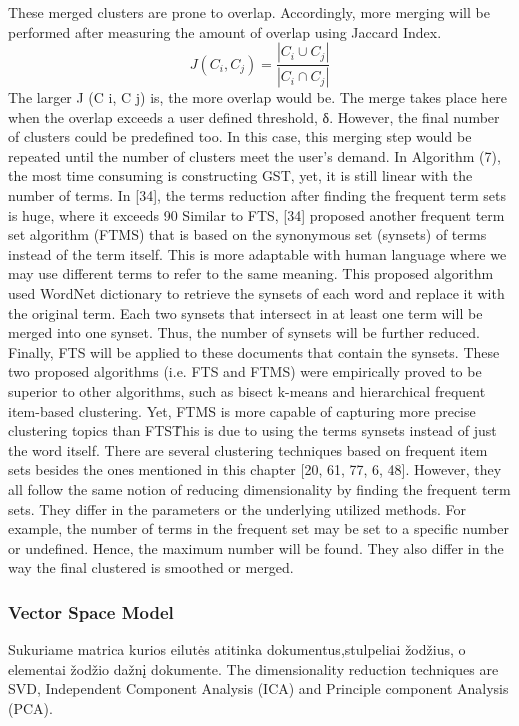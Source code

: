 \documentclass{VUMIFInfKursinis}
\begin{document}
These merged clusters are prone to overlap. Accordingly, more merging will be performed after measuring the amount of overlap using Jaccard Index.
\begin{equation}
	J(C_i,C_j) = \frac{|C_i \cup C_j|}{|C_i \cap C_j|}
\end{equation}
The larger J (C i, C j) is, the more overlap would be. The merge takes place here when the overlap exceeds a user defined threshold, δ. However, the final number of clusters could be predefined too. In this case, this merging step would be repeated until the number of clusters meet the user’s demand.
In Algorithm (7), the most time consuming is constructing GST, yet, it is still linear with the number of terms. In [34], the terms reduction after finding the frequent term sets is huge, where it exceeds 90%
Similar to FTS, [34] proposed another frequent term set algorithm (FTMS) that is based on the synonymous set (synsets) of terms instead of the term itself. This is more adaptable with human language where we may use different terms to refer to the same meaning.  This proposed algorithm used WordNet dictionary to retrieve the synsets of each word and replace it with the original term. Each two synsets that intersect in at least one term will be merged into one synset. Thus, the number of synsets will be further reduced. Finally, FTS will be applied to these documents that contain the synsets.
These two proposed algorithms (i.e. FTS and FTMS) were empirically proved to be superior to other algorithms, such as bisect k-means and hierarchical frequent item-based clustering. Yet, FTMS is more capable of capturing more precise clustering topics than FTS\. This is due to using the terms synsets instead of just the word itself.
There are several clustering techniques based on frequent item sets besides the ones mentioned in this chapter [20, 61, 77, 6, 48]. However, they all follow the same notion of reducing dimensionality by finding the frequent term sets. They differ in the parameters or the underlying utilized methods. For example, the number of terms in the frequent set may be set to a specific number or undefined. Hence, the maximum number will be found. They also differ in the way the final clustered is smoothed or merged.

\subsubsection{Vector Space Model}
Sukuriame matrica kurios eilutės atitinka dokumentus,stulpeliai žodžius, o elementai žodžio dažnį dokumente.
The dimensionality reduction techniques are SVD, Independent Component Analysis (ICA) and Principle component Analysis (PCA). 
\end{document}
